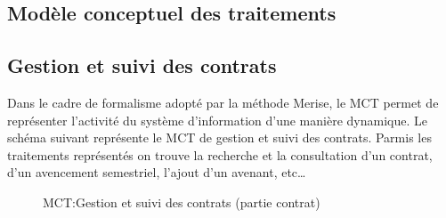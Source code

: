 \documentclass[a4paper]{report}
\begin{document}
\begin{doublespace}
	\section{Modèle conceptuel des traitements}
	\subsection{Gestion et suivi des contrats}

	Dans le cadre de formalisme adopté par la méthode Merise, le MCT permet de représenter l’activité du
	système d’information d’une manière dynamique.
	Le schéma suivant représente le MCT de gestion et suivi des contrats. Parmis les traitements représentés
	on trouve la recherche et la consultation d'un contrat, d'un avencement semestriel,
	l'ajout d'un avenant, etc\dots

	\begin{figure}[H]
		\begin{center}
			\caption{MCT:Gestion et suivi des contrats (partie contrat)}
		\end{center}
	\end{figure}


\end{doublespace}
\end{document}
